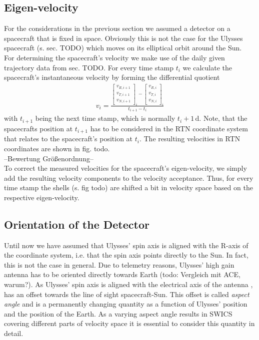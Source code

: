 \subsection{Eigen-velocity}
For the considerations in the previous section we assumed a detector on a spacecraft that is fixed in space. Obviously this is not the case for the Ulysses spacecraft (s. sec. TODO) which moves on its elliptical orbit around the Sun. \\
For determining the spacecraft's velocity we make use of the daily given trajectory data from sec. TODO. For every time stamp $t_i$ we calculate the spacecraft's instantaneous velocity by forming the differential quotient 
\begin{align*}
v_i = \frac{ \begin{bmatrix}v_{R,i+1}\\v_{T,i+1}\\v_{N,i+1}\end{bmatrix}_i  - \begin{bmatrix}v_{R,i}\\v_{T,i}\\v_{N,i}\end{bmatrix}_i} {t_{i+1} - t_i}
\end{align*}
with $t_{i+1}$ being the next time stamp, which is normally $t_i + 1\,\mathrm{d}$. Note, that the spacecrafts position at $t_{i+1}$ has to be considered in the RTN coordinate system that relates to the spacecraft's position at $t_i$. The resulting velocities in RTN coordinates are shown in fig. todo.
\\
--Bewertung Größenordnung--
\\
To correct the measured velocities for the spacecraft's eigen-velocity, we simply add the resulting velocity components to the velocity acceptance. Thus, for every time stamp the shells (s. fig todo) are shifted a bit in velocity space based on the respective eigen-velocity.


\subsection{Orientation of the Detector}
Until now we have assumed that Ulysses' spin axis is aligned with the R-axis of the coordinate system, i.e. that the spin axis points directly to the Sun. In fact, this is not the case in general. Due to telemetry reasons, Ulysses' high gain antenna has to be oriented directly towards Earth (todo: Vergleich mit ACE, warum?). As Ulysses' spin axis is aligned with the electrical axis of the antenna \citep{wenzel_ulysses}, has an offset towards the line of sight spacecraft-Sun. This offset is called \textit{aspect angle} and is a permanently changing quantity as a function of Ulysses' position and the position of the Earth. As a varying aspect angle results in SWICS covering different parts of velocity space it is essential to consider this quantity in detail.
%
%
